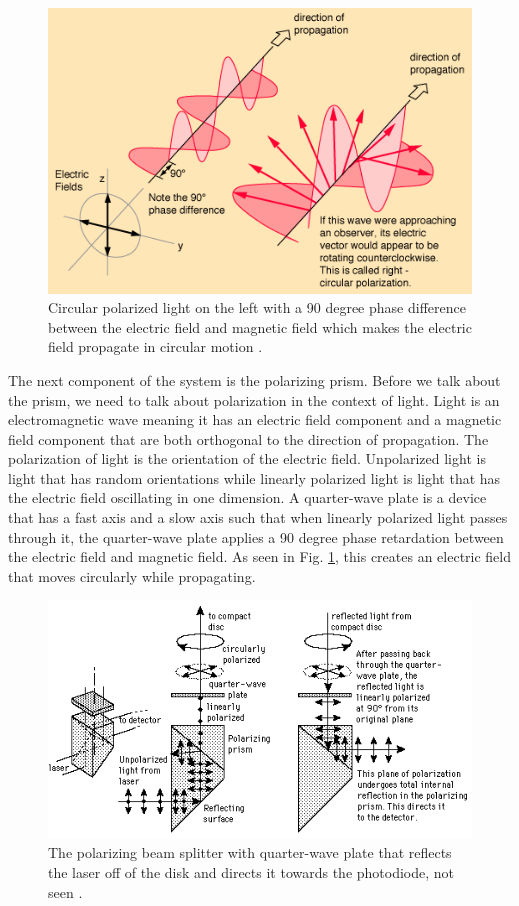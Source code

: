 \documentclass[ notitlepage, numerical, 11pt]{revtex4-1} %
\begin{document}
\begin{figure}[H]
\centerline{\includegraphics[scale=.7]{polcir.png}}
\caption{Circular polarized light on the left with a 90 degree phase difference between the electric field and magnetic field which makes the electric field propagate in circular motion \cite{wikiPic}.}
\label{circular}
\end{figure} 




The next component of the system is the polarizing prism. Before we talk about the prism, we need to talk about polarization in the context of light. Light is an electromagnetic wave meaning it has an electric field component and a magnetic field component that are both orthogonal to the direction of propagation. The polarization of light is the orientation of the electric field. Unpolarized light is light that has random orientations while linearly polarized light is light that has the electric field oscillating in one dimension. A quarter-wave plate is a device that has a fast axis and a slow axis such that when linearly polarized light passes through it, the quarter-wave plate applies a 90 degree phase retardation between the electric field and magnetic field. As seen in Fig. \ref{circular}, this creates an electric field that moves circularly while propagating. 


\begin{figure}[H]
\centerline{\includegraphics[scale=.8]{prism.png}}
\caption{The polarizing beam splitter with quarter-wave plate that reflects the laser off of the disk and directs it towards the photodiode, not seen \cite {hyper}.}
\label{prism}
\end{figure} 
\end{document}
